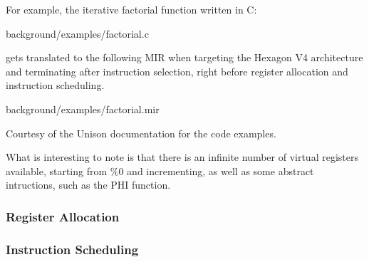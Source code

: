 For example, the iterative factorial function written in C:


{background/examples/factorial.c}

gets translated to the following MIR when targeting the Hexagon V4 architecture and
terminating after instruction selection, right before register allocation and instruction
scheduling.


{background/examples/factorial.mir}

Courtesy of the Unison documentation for the code examples.

What is interesting to note is that there is an infinite number of virtual registers available,
starting from \%0 and incrementing, as well as some abstract intructions, such as the PHI
function.

\subsubsection{Register Allocation}



\subsubsection{Instruction Scheduling}

